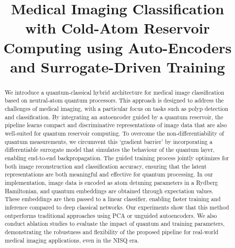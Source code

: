 \documentclass[conference]{IEEEtran}
\begin{document}
\title{Medical Imaging Classification with Cold-Atom Reservoir Computing using Auto-Encoders and Surrogate-Driven Training\\
}

\author{}


\maketitle


\begin{abstract}
We introduce a quantum-classical hybrid
architecture for medical image classification based on neutral-atom quantum processors. 
This approach is designed to address the challenges of
medical imaging, with a particular focus on tasks such
as polyp detection and classification.
By integrating an autoencoder guided by a quantum 
reservoir, the pipeline learns compact and discriminative 
representations of image data that are also well-suited for quantum reservoir 
computing. To overcome the non-differentiability of quantum 
measurements, we circumvent this `gradient barrier' 
by incorporating a differentiable surrogate model that simulates the 
behaviour of the quantum layer, enabling end-to-end backpropagation. 
The guided training process jointly optimizes for both image 
reconstruction and classification accuracy, ensuring that the latent 
representations are both meaningful and effective for quantum processing. 
In our implementation, image data is encoded as atom detuning parameters 
in a Rydberg Hamiltonian, and quantum embeddings are obtained through expectation 
values. These embeddings are then passed to a linear classifier, 
enabling faster training and inference compared to deep classical networks.
Our experiments show that this method outperforms traditional 
approaches using PCA or unguided autoencoders. We also conduct 
ablation studies to evaluate the impact of quantum and training 
parameters, demonstrating the robustness and flexibility of the 
proposed pipeline for real-world medical imaging applications, 
even in the NISQ era.
\end{abstract}
\end{document}
